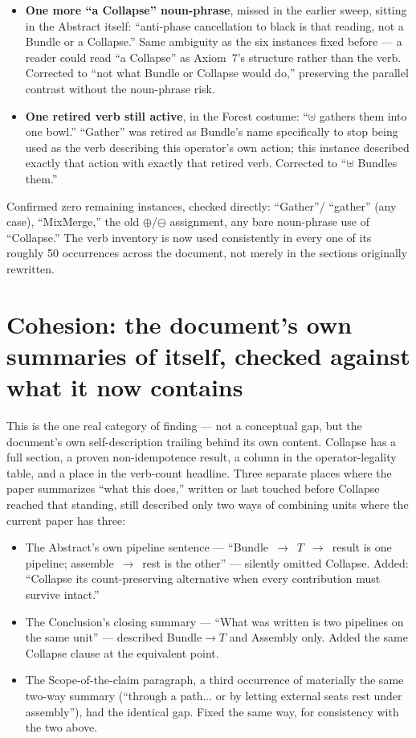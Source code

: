 \documentclass[11pt]{article}
\begin{document}
\begin{itemize}
\item \textbf{One more ``a Collapse'' noun-phrase}, missed in the
earlier sweep, sitting in the Abstract itself: ``anti-phase
cancellation to black is that reading, not a Bundle or a Collapse.''
Same ambiguity as the six instances fixed before --- a reader could
read ``a Collapse'' as Axiom~7's structure rather than the verb.
Corrected to ``not what Bundle or Collapse would do,'' preserving
the parallel contrast without the noun-phrase risk.
\item \textbf{One retired verb still active}, in the Forest costume:
``$\uplus$ gathers them into one bowl.'' ``Gather'' was retired as
Bundle's name specifically to stop being used as the verb describing
this operator's own action; this instance described exactly that
action with exactly that retired verb. Corrected to ``$\uplus$
Bundles them.''
\end{itemize}

Confirmed zero remaining instances, checked directly: ``Gather''/
``gather'' (any case), ``MixMerge,'' the old $\oplus$/$\ominus$
assignment, any bare noun-phrase use of ``Collapse.'' The verb
inventory is now used consistently in every one of its roughly 50
occurrences across the document, not merely in the sections
originally rewritten.

\section{Cohesion: the document's own summaries of itself, checked
against what it now contains}

This is the one real category of finding --- not a conceptual gap,
but the document's own self-description trailing behind its own
content. Collapse has a full section, a proven non-idempotence
result, a column in the operator-legality table, and a place in the
verb-count headline. Three separate places where the paper
summarizes ``what this does,'' written or last touched before
Collapse reached that standing, still described only two ways of
combining units where the current paper has three:

\begin{itemize}
\item The Abstract's own pipeline sentence --- ``Bundle~$\to$~$T$~$\to$~result
is one pipeline; assemble~$\to$~rest is the other'' --- silently
omitted Collapse. Added: ``Collapse its count-preserving alternative
when every contribution must survive intact.''
\item The Conclusion's closing summary --- ``What was written is two
pipelines on the same unit'' --- described Bundle$\to T$ and Assembly
only. Added the same Collapse clause at the equivalent point.
\item The Scope-of-the-claim paragraph, a third occurrence of
materially the same two-way summary (``through a path... or by
letting external seats rest under assembly''), had the identical gap.
Fixed the same way, for consistency with the two above.
\end{itemize}
\end{document}
